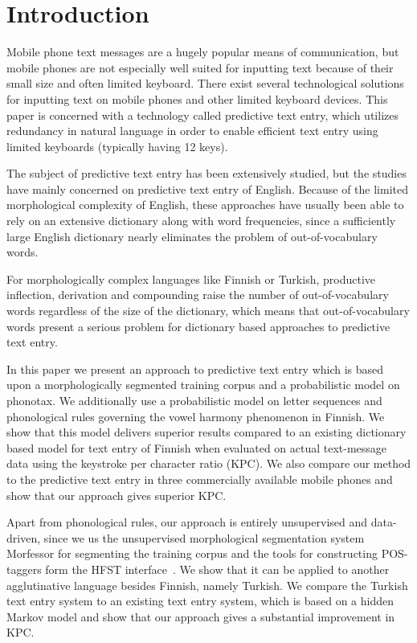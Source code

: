 \documentclass{llncs}
\begin{document}
\section{Introduction}

Mobile phone text messages are a hugely popular means of
communication, but mobile phones are not especially well suited for
inputting text because of their small size and often limited
keyboard. There exist several technological solutions for inputting text
on mobile phones and other limited keyboard devices. This paper is
concerned with a technology called predictive text entry, which
utilizes redundancy in natural language in order to enable efficient
text entry using limited keyboards (typically having 12 keys).

The subject of predictive text entry has been extensively studied, but
the studies have mainly concerned on predictive text entry of
English. Because of the limited morphological complexity of English,
these approaches have usually been able to rely on an extensive
dictionary along with word frequencies, since a sufficiently large
English dictionary nearly eliminates the problem of out-of-vocabulary
words. 

For morphologically complex languages like Finnish or Turkish,
productive inflection, derivation and compounding raise the number of
out-of-vocabulary words regardless of the size of the dictionary,
which means that out-of-vocabulary words present a serious problem for
dictionary based approaches to predictive text entry.

In this paper we present an approach to predictive text entry which is
based upon a morphologically segmented training corpus and a
probabilistic model on phonotax. We additionally use a probabilistic
model on letter sequences and phonological rules governing the vowel
harmony phenomenon in Finnish. We show that this model delivers
superior results compared to an existing dictionary based model for
text entry of Finnish when evaluated on actual text-message data using
the keystroke per character ratio (KPC). We also compare our method to
the predictive text entry in three commercially available mobile
phones and show that our approach gives superior KPC.

Apart from phonological rules, our approach is entirely unsupervised
and data-driven, since we us the unsupervised morphological
segmentation system Morfessor \cite{Creutz07ACMTSLP} for segmenting
the training corpus and the tools for constructing POS-taggers form the HFST interface~\cite{hfst/2011}. We show that it can be applied to another
agglutinative language besides Finnish, namely Turkish. We compare the
Turkish text entry system to an existing text entry system, which is
based on a hidden Markov model and show that our approach gives a
substantial improvement in KPC.
\end{document}
